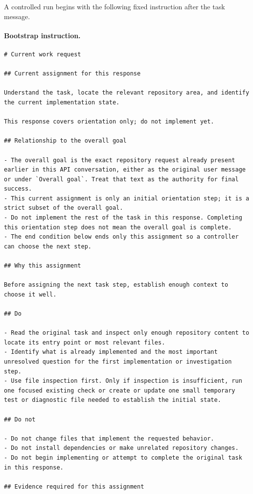 A controlled run begins with the following fixed instruction after the task message.

\paragraph{Bootstrap instruction.}
\mbox{}\par\nobreak
\begin{lstlisting}[style=looparenaprompt]
# Current work request

## Current assignment for this response

Understand the task, locate the relevant repository area, and identify the current implementation state.

This response covers orientation only; do not implement yet.

## Relationship to the overall goal

- The overall goal is the exact repository request already present earlier in this API conversation, either as the original user message or under `Overall goal`. Treat that text as the authority for final success.
- This current assignment is only an initial orientation step; it is a strict subset of the overall goal.
- Do not implement the rest of the task in this response. Completing this orientation step does not mean the overall goal is complete.
- The end condition below ends only this assignment so a controller can choose the next step.

## Why this assignment

Before assigning the next task step, establish enough context to choose it well.

## Do

- Read the original task and inspect only enough repository content to locate its entry point or most relevant files.
- Identify what is already implemented and the most important unresolved question for the first implementation or investigation step.
- Use file inspection first. Only if inspection is insufficient, run one focused existing check or create or update one small temporary test or diagnostic file needed to establish the initial state.

## Do not

- Do not change files that implement the requested behavior.
- Do not install dependencies or make unrelated repository changes.
- Do not begin implementing or attempt to complete the original task in this response.

## Evidence required for this assignment


\end{lstlisting}
